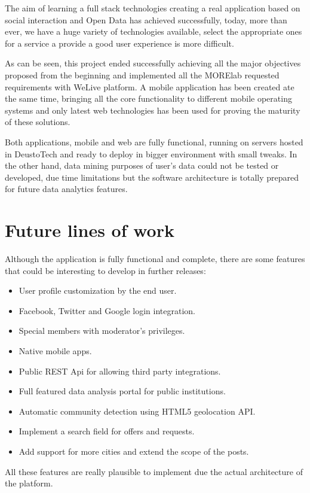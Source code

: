\documentclass{DeustoFDP}
\begin{document}
The aim of learning a full stack technologies creating a real application based on social interaction and Open Data has achieved successfully, today, more than ever, we have a huge variety of technologies available, select the appropriate ones for a service a provide a good user experience is more difficult.

As can be seen, this project ended successfully achieving all the major objectives proposed from the beginning and implemented all the MORElab requested requirements with WeLive platform. A mobile application has been created ate the same time, bringing all the core functionality to different mobile operating systems and only latest web technologies has been used for proving the maturity of these solutions.

Both applications, mobile and web are fully functional, running on servers hosted in DeustoTech and ready to deploy in bigger environment with small tweaks. In the other hand, data mining purposes of user's data could not be tested or developed, due time limitations but the software architecture is totally prepared for future data analytics features.

\section{Future lines of work}
Although the application is fully functional and complete, there are some features that could be interesting to develop in further releases:

\begin{itemize}
	\item User profile customization by the end user.
	\item Facebook, Twitter and Google login integration.
	\item Special members with moderator's privileges.
	\item Native mobile apps.
	\item Public REST Api for allowing third party integrations.
	\item Full featured data analysis portal for public institutions.
	\item Automatic community detection using HTML5 geolocation API.
	\item Implement a search field for offers and requests.
	\item Add support for more cities and extend the scope of the posts.
\end{itemize}

All these features are really plausible to implement due the actual architecture of the platform.
\end{document}
